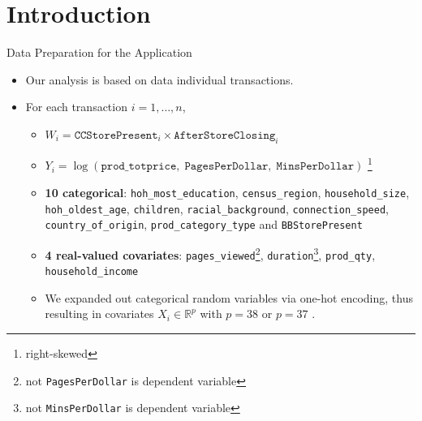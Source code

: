 \documentclass[mathserif, xcolor=table]{beamer}
\begin{document}
\section{Introduction}
\begin{frame}{Data Preparation for the Application}
\begin{itemize}
    \item Our analysis is based on data individual transactions. 
    \item For each transaction $i=1,\dots,n$,
    \begin{itemize}
        \item $W_i=\texttt{CCStorePresent}_i\times\texttt{AfterStoreClosing}_i$
        \item $Y_i=\log\left(\texttt{prod\_totprice},\;\texttt{PagesPerDollar},\;\texttt{MinsPerDollar}\right)$ \footnote{right-skewed}
        \item  \textbf{10 categorical}: \texttt{hoh\_most\_education}, \texttt{census\_region}, \texttt{household\_size}, \texttt{hoh\_oldest\_age}, \texttt{children}, \texttt{racial\_background}, \texttt{connection\_speed}, \texttt{country\_of\_origin}, \texttt{prod\_category\_type} and \texttt{BBStorePresent}
        \item \textbf{4 real-valued covariates}: \texttt{pages\_viewed}\footnote{not \texttt{PagesPerDollar} is dependent variable}, \texttt{duration}\footnote{not \texttt{MinsPerDollar} is dependent variable}, \texttt{prod\_qty}, \texttt{household\_income}
        \item We expanded out categorical random variables via one-hot encoding, thus resulting in covariates $X_i \in \mathbb{R}^p$  with $p = 38$ or $p = 37$ .
    \end{itemize}
\end{itemize}

\end{frame}
\end{document}

